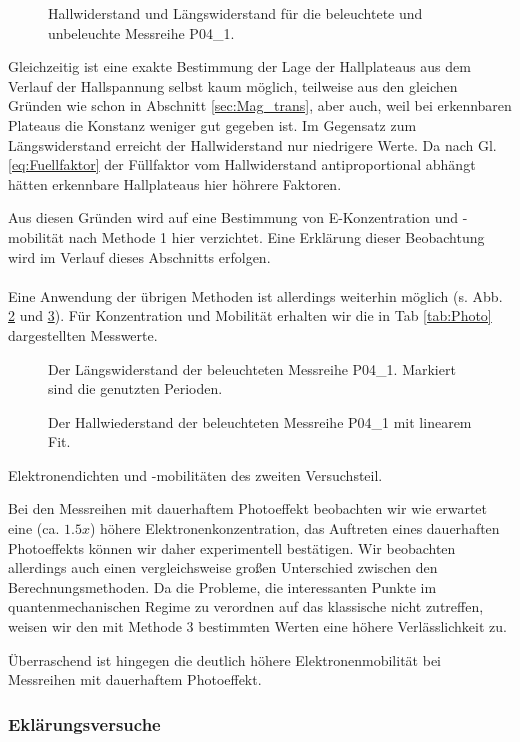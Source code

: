 \begin{figure}[h!]
	\centering
	
	\caption{Hallwiderstand und Längswiderstand für die beleuchtete und unbeleuchte Messreihe P04\_1.}
	\label{abb:P04_Compare}
\end{figure}
Gleichzeitig ist eine exakte Bestimmung der Lage der Hallplateaus aus dem Verlauf der Hallspannung selbst kaum möglich, teilweise aus den gleichen Gründen wie schon in Abschnitt \ref{sec:Mag_trans}, aber auch, weil bei erkennbaren Plateaus die Konstanz weniger gut gegeben ist. Im Gegensatz zum Längswiderstand erreicht der Hallwiderstand nur niedrigere Werte. Da nach Gl. \ref{eq:Fuellfaktor} der Füllfaktor vom Hallwiderstand antiproportional abhängt hätten erkennbare Hallplateaus hier höhrere Faktoren.
 
Aus diesen Gründen wird auf eine Bestimmung von E-Konzentration und -mobilität nach Methode 1 hier verzichtet. Eine Erklärung dieser Beobachtung wird im Verlauf dieses Abschnitts erfolgen. \\
\\
Eine Anwendung der übrigen Methoden ist allerdings weiterhin möglich (s. Abb. \ref{abb:P04_Meth_2} und \ref{abb:P04_Meth_3}).
Für Konzentration und Mobilität erhalten wir die in Tab \ref{tab:Photo} dargestellten Messwerte. \\


\begin{figure}[h!]
	\centering
	
	\caption{Der Längswiderstand der beleuchteten Messreihe P04\_1. Markiert sind die genutzten Perioden.}
	\label{abb:P04_Meth_2}
\end{figure}

\begin{figure}[h!]
	\centering
	
	\caption{Der Hallwiederstand der beleuchteten Messreihe P04\_1 mit linearem Fit.}
	\label{abb:P04_Meth_3}
\end{figure}

\begin{table}[h!]
	\centering
	\caption{Elektronendichten und -mobilitäten des zweiten Versuchsteil.}
	
	\label{tab:Photo}
\end{table}
Bei den Messreihen mit dauerhaftem Photoeffekt beobachten wir wie erwartet eine (ca. $1.5x$) höhere Elektronenkonzentration, das Auftreten eines dauerhaften Photoeffekts können wir daher experimentell bestätigen. Wir beobachten allerdings auch einen vergleichsweise großen Unterschied zwischen den Berechnungsmethoden. Da die Probleme, die interessanten Punkte im quantenmechanischen Regime zu verordnen auf das klassische nicht zutreffen, weisen wir den mit Methode 3 bestimmten Werten eine höhere Verlässlichkeit zu. 

Überraschend ist hingegen die deutlich höhere Elektronenmobilität bei Messreihen mit dauerhaftem Photoeffekt. 

\subsubsection{Eklärungsversuche}



